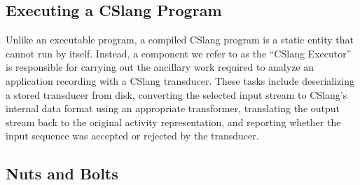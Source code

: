 \subsection{Executing a CSlang Program}

Unlike an executable program, a compiled CSlang program is a static entity
that cannot run by itself.  Instead, a component we refer to as the
``CSlang Executor'' is responsible for carrying out the ancillary work
required to analyze an application recording with a CSlang transducer.
These tasks include deserializing a stored transducer from disk, converting
the selected input stream to CSlang's internal data format using an
appropriate transformer, translating the output stream back to the original
activity representation, and reporting whether the input sequence was
accepted or rejected by the transducer.


\subsection{Nuts and Bolts}


